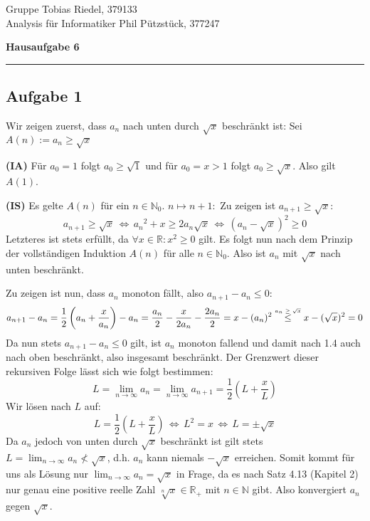 \documentclass[a4paper,graphics,11pt]{article}
\newcommand{\aufgabe}[1]{\subsection*{Aufgabe #1}}
\newcommand{\up}[2]{\mathrel{\overset{\makebox[0pt]{\mbox{\normalfont\tiny #2}}}{#1}}}
\begin{document}
\noindent Gruppe              \hfill Tobias Riedel, 379133 \\
\noindent Analysis für Informatiker             \hfill Phil Pützstück, 377247 \\
\begin{center}
	\LARGE{\textbf{Hausaufgabe 6}}
\end{center}
\begin{center}
\rule[0.1ex]{\textwidth}{1pt}
\end{center}
\aufgabe{1}
Wir zeigen zuerst, dass $a_n$ nach unten durch $\sqrt{x}$ beschränkt ist:
Sei $A(n) := a_n \geq \sqrt{x}$

\textbf{(IA)}
Für $a_0 = 1$ folgt $a_0 \geq \sqrt{1}$ und für $a_0 = x > 1$ folgt $a_0 \geq \sqrt{x}$. Also gilt $A(1)$.

\textbf{(IS)} Es gelte $A(n)$ für ein $n\in \mathbb{N}_0$. $n\mapsto n+1\colon$
Zu zeigen ist $a_{n+1} \geq \sqrt{x}\colon$
$$
    a_{n+1} \geq \sqrt{x} \,\Longleftrightarrow\, {a_n}^2+x \geq 2a_n\sqrt{x}
    \,\Longleftrightarrow\, (a_n-\sqrt{x})^2 \geq 0
$$
Letzteres ist stets erfüllt, da $\forall x \in \mathbb{R}\colon x^2 \geq 0$ gilt. Es folgt
nun nach dem Prinzip der vollständigen Induktion $A(n)$ für alle $n\in \mathbb{N}_0$.
Also ist $a_n$ mit $\sqrt{x}$ nach unten beschränkt.

Zu zeigen ist nun, dass $a_n$ monoton fällt, also $a_{n+1} - a_n \leq 0$:
$$
    a_{n+1} - a_n = \frac{1}{2}\left(a_n+\frac{x}{a_n}\right) - a_n
    = \frac{a_n}{2} - \frac{x}{2a_n} - \frac{2a_n}{2} = x - (a_n)^2\quad
    \up{\leq}{$a_n \geq \sqrt{x}$} \quad x-(\sqrt{x})^2 = 0
$$
Da nun stets $a_{n+1}-a_n \leq 0$ gilt, ist $a_n$ monoton fallend und damit nach 1.4 auch
nach oben beschränkt, also insgesamt beschränkt.
Der Grenzwert dieser rekursiven Folge lässt sich wie folgt bestimmen:
$$
    L = \lim_{n \to \infty} a_n = \lim_{n \to \infty} a_{n+1}
    = \frac{1}{2}\left(L + \frac{x}{L}\right)
$$
Wir lösen nach $L$ auf:
$$
    L = \frac{1}{2}\left(L + \frac{x}{L}\right) \,\Longleftrightarrow\, L^2 = x
    \,\Longleftrightarrow\, L = \pm \sqrt{x}
$$
Da $a_n$ jedoch von unten durch $\sqrt{x}$ beschränkt ist gilt stets
$L = \lim_{n \to \infty}\limits a_n \not< \sqrt{x}$, d.h. $a_n$ kann niemals $-\sqrt{x}$
erreichen. Somit kommt für uns als Lösung nur $\lim_{n \to \infty}\limits a_n = \sqrt{x}$
in Frage, da es nach Satz 4.13 (Kapitel 2) nur genau eine positive reelle Zahl
$\sqrt[n]{x}\in \mathbb{R}_+ $ mit $n \in \mathbb{N}$ gibt.
Also konvergiert $a_n$ gegen $\sqrt{x}$.
\end{document}
